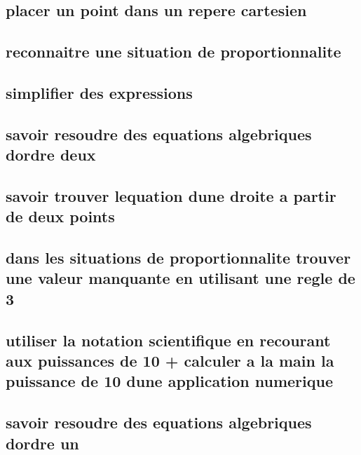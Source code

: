 \documentclass[11pt]{article}
\begin{document}
    \subsection{placer un point dans un repere cartesien}
      
    \subsection{reconnaitre une situation de proportionnalite}
      
    \subsection{simplifier des expressions}
      
    \subsection{savoir resoudre des equations algebriques dordre deux}
      
    \subsection{savoir trouver lequation dune droite a partir de deux points}
      
    \subsection{dans les situations de proportionnalite  trouver une valeur manquante en utilisant une regle de 3}
      
      
    \subsection{utiliser la notation scientifique en recourant aux puissances de 10 + calculer a la main la puissance de 10 dune application numerique}
      
    \subsection{savoir resoudre des equations algebriques dordre un}
      
\end{document}
